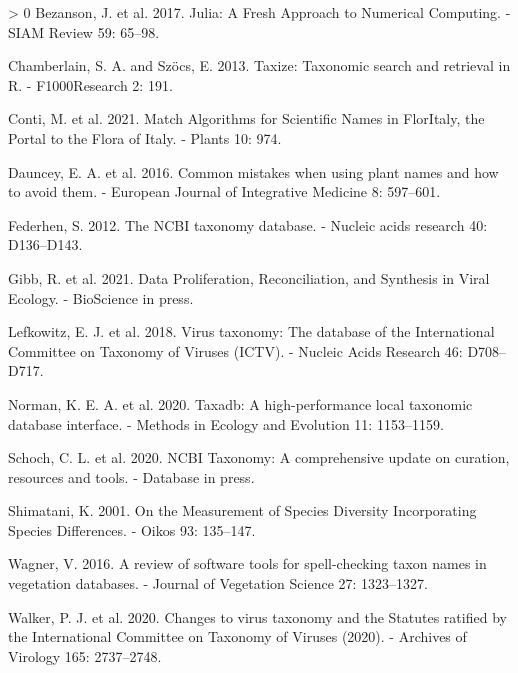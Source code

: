 \documentclass[10pt,oneside]{article}
\newlength{\cslhangindent}
\newenvironment{CSLReferences}[3] %
 {%
  \setlength{\parindent}{0pt}
  \ifodd #1 \everypar{\setlength{\hangindent}{\cslhangindent}}\ignorespaces\fi
  \ifnum #2 > 0
  \setlength{\parskip}{#2\baselineskip}
  \fi
 }%
 {}
\begin{document}
\hypertarget{refs}{}
\begin{CSLReferences}{1}{0}
\leavevmode\hypertarget{ref-Bezanson2017JulFre}{}%
Bezanson, J. et al. 2017. Julia: A Fresh Approach to Numerical
Computing. - SIAM Review 59: 65--98.

\leavevmode\hypertarget{ref-Chamberlain2013TaxTax}{}%
Chamberlain, S. A. and Szöcs, E. 2013. Taxize: Taxonomic search and
retrieval in R. - F1000Research 2: 191.

\leavevmode\hypertarget{ref-Conti2021MatAlg}{}%
Conti, M. et al. 2021. Match Algorithms for Scientific Names in
FlorItaly, the Portal to the Flora of Italy. - Plants 10: 974.

\leavevmode\hypertarget{ref-Dauncey2016ComMis}{}%
Dauncey, E. A. et al. 2016. Common mistakes when using plant names and
how to avoid them. - European Journal of Integrative Medicine 8:
597--601.

\leavevmode\hypertarget{ref-Federhen2012NcbTax}{}%
Federhen, S. 2012. The NCBI taxonomy database. - Nucleic acids research
40: D136--D143.

\leavevmode\hypertarget{ref-Gibb2021DatPro}{}%
Gibb, R. et al. 2021. Data Proliferation, Reconciliation, and Synthesis
in Viral Ecology. - BioScience in press.

\leavevmode\hypertarget{ref-Lefkowitz2018VirTax}{}%
Lefkowitz, E. J. et al. 2018. Virus taxonomy: The database of the
International Committee on Taxonomy of Viruses (ICTV). - Nucleic Acids
Research 46: D708--D717.

\leavevmode\hypertarget{ref-Norman2020TaxHig}{}%
Norman, K. E. A. et al. 2020. Taxadb: A high-performance local taxonomic
database interface. - Methods in Ecology and Evolution 11: 1153--1159.

\leavevmode\hypertarget{ref-Schoch2020NcbTax}{}%
Schoch, C. L. et al. 2020. NCBI Taxonomy: A comprehensive update on
curation, resources and tools. - Database in press.

\leavevmode\hypertarget{ref-Shimatani2001MeaSpe}{}%
Shimatani, K. 2001. On the Measurement of Species Diversity
Incorporating Species Differences. - Oikos 93: 135--147.

\leavevmode\hypertarget{ref-Wagner2016RevSof}{}%
Wagner, V. 2016. A review of software tools for spell-checking taxon
names in vegetation databases. - Journal of Vegetation Science 27:
1323--1327.

\leavevmode\hypertarget{ref-Walker2020ChaVir}{}%
Walker, P. J. et al. 2020. Changes to virus taxonomy and the Statutes
ratified by the International Committee on Taxonomy of Viruses (2020). -
Archives of Virology 165: 2737--2748.

\end{CSLReferences}
\end{document}
